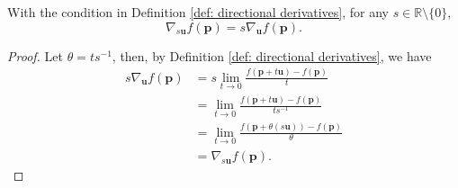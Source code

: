 \begin{theorem}
	\label{thm: directional derivatives: scalar multiplication}
	With the condition in Definition \ref{def: directional derivatives}, for any $s \in \mathbb R \setminus \{ 0 \}$,
	$$
	\nabla_{s\mathbf u}f(\mathbf p) = s\nabla_{\mathbf u} f(\mathbf p).
	$$
	
	\begin{proof}
		Let $\theta = ts^{-1}$, then, by Definition \ref{def: directional derivatives}, we have
		$$
		\begin{aligned}
			s\nabla_{\mathbf u} f(\mathbf p) &= s\lim_{t \to 0} \frac{f(\mathbf p + t\mathbf u) - f(\mathbf p)}{t} \\
			&= \lim_{t \to 0} \frac{f(\mathbf p + t\mathbf u) - f(\mathbf p)}{ts^{-1}} \\
			&= \lim_{t \to 0} \frac{f(\mathbf p + \theta (s \mathbf u)) - f(\mathbf p)}{\theta} \\
			&= \nabla_{s\mathbf u} f(\mathbf p).
		\end{aligned}
		$$
		
	\end{proof}
\end{theorem}



